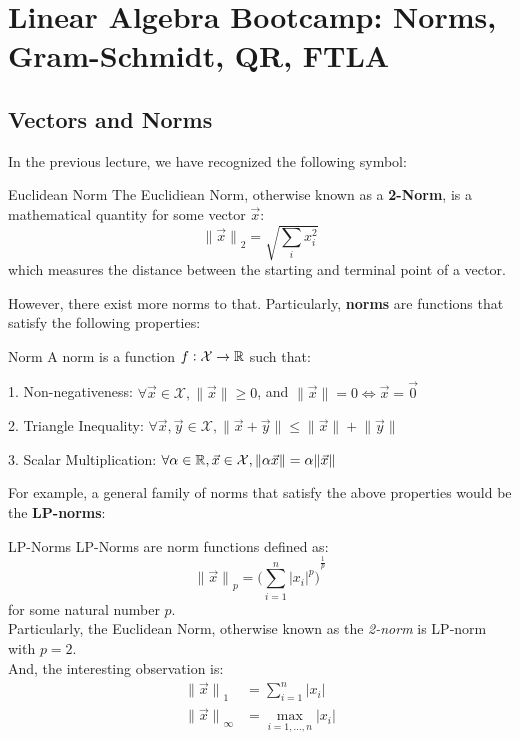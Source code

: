 \chapter{
    Linear Algebra Bootcamp: Norms, Gram-Schmidt, QR, FTLA
}

\section{Vectors and Norms}
In the previous lecture, we have recognized the following symbol:
\begin{ln-symbol}{Euclidean Norm}{}
    The Euclidiean Norm, otherwise known as a \textbf{2-Norm}, is a mathematical quantity for some vector $\vec{x}$:
    \[
        {\lVert \vec{x} \rVert}_2 = \sqrt{\sum_i x_i^2}
    \]
    which measures the distance between the starting and terminal point of a vector.
\end{ln-symbol}
However, there exist more norms to that. Particularly, \textbf{norms} are functions that satisfy the following properties:
\begin{ln-define}{Norm}{}
    A norm is a function $f: \mathcal{X} \rightarrow \mathbb{R}$ such that:
    \begin{bindenum}
        \item[1.] Non-negativeness: $\forall \vec{x} \in \mathcal{X}, \lVert \vec{x} \rVert \geq 0$, and $\lVert \vec{x} \rVert = 0 \iff \vec{x} = \vec{0}$
        \item[2.] Triangle Inequality: $\forall \vec{x}, \vec{y} \in \mathcal{X}, \lVert \vec{x} + \vec{y} \rVert \leq \lVert \vec{x} \rVert + \lVert \vec{y} \rVert$
        \item[3.] Scalar Multiplication: $\forall \alpha \in \mathbb{R}, \vec{x} \in \mathcal{X}, \lVert \alpha \vec{x} \rVert = \alpha \lVert \vec{x} \rVert$
    \end{bindenum}
\end{ln-define}
For example, a general family of norms that satisfy the above properties would be the \textbf{LP-norms}:
\begin{ln-define}{LP-Norms}{}
    LP-Norms are norm functions defined as:
    \[
        {\lVert \vec{x} \rVert}_p = {\bigg( \sum_{i = 1}^n |x_i|^p \bigg)}^{\frac{1}{p}}
    \]
    for some natural number $p$. \\
    Particularly, the Euclidean Norm, otherwise known as the \textit{2-norm} is LP-norm with $p = 2$. \\
    And, the interesting observation is:
    \begin{align*}
        {\lVert \vec{x} \rVert}_1 &= \sum_{i = 1}^n |x_i| \\
        {\lVert \vec{x} \rVert}_\infty &= \max_{i = 1, \dots, n} |x_i| \\
    \end{align*}
\end{ln-define}

